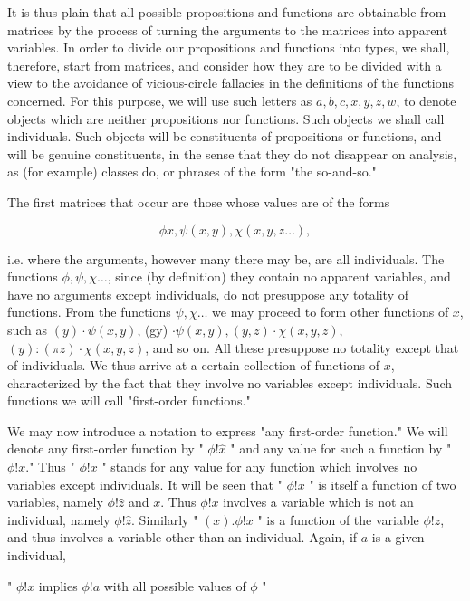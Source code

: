 \documentclass[10pt]{article}
\begin{document}
It is thus plain that all possible propositions and functions are obtainable from matrices by the process of turning the arguments to the matrices into apparent variables. In order to divide our propositions and functions into types, we shall, therefore, start from matrices, and consider how they are to be divided with a view to the avoidance of vicious-circle fallacies in the definitions of the functions concerned. For this purpose, we will use such letters as $a, b, c, x, y, z, w$, to denote objects which are neither propositions nor functions. Such objects we shall call individuals. Such objects will be constituents of propositions or functions, and will be genuine constituents, in the sense that they do not disappear on analysis, as (for example) classes do, or phrases of the form "the so-and-so."

The first matrices that occur are those whose values are of the forms

$$
\phi x, \psi(x, y), \chi(x, y, z \ldots),
$$

i.e. where the arguments, however many there may be, are all individuals. The functions $\phi, \psi, \chi \ldots$, since (by definition) they contain no apparent variables, and have no arguments except individuals, do not presuppose any totality of functions. From the functions $\psi, \chi \ldots$ we may proceed to form other functions of $x$, such as $(y) \cdot \psi(x, y)$, (gy) $\cdot \psi(x, y),(y, z) \cdot \chi(x, y, z)$, $(y):(\pi z) \cdot \chi(x, y, z)$, and so on. All these presuppose no totality except that of individuals. We thus arrive at a certain collection of functions of $x$, characterized by the fact that they involve no variables except individuals. Such functions we will call "first-order functions."

We may now introduce a notation to express "any first-order function." We will denote any first-order function by " $\phi!\hat{x}$ " and any value for such a function by " $\phi!x$." Thus " $\phi!x$ " stands for any value for any function which involves no variables except individuals. It will be seen that " $\phi!x$ " is itself a function of two variables, namely $\phi!\hat{z}$ and $x$. Thus $\phi!x$ involves a variable which is not an individual, namely $\phi!\hat{z}$. Similarly " $(x) . \phi!x$ " is a function of the variable $\phi!\hat{z}$, and thus involves a variable other than an individual. Again, if $a$ is a given individual,

\begin{displayquote}
" $\phi!x$ implies $\phi!a$ with all possible values of $\phi$ "
\end{displayquote}
\end{document}
